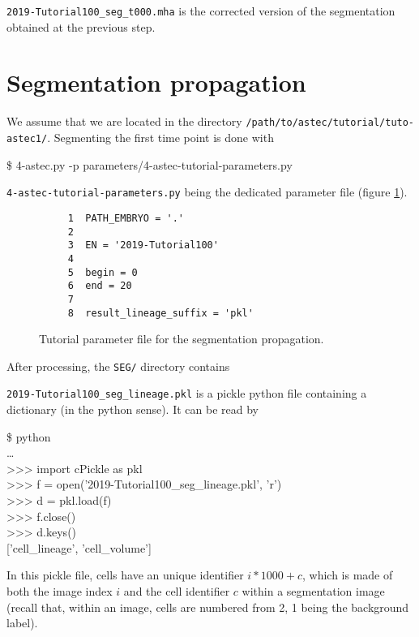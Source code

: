 \texttt{2019-Tutorial100\_seg\_t000.mha} is the corrected version of
the segmentation obtained at the previous step.



\section{Segmentation propagation}
\label{sec:tutorial:segmentation:propagation}

We assume that we are located in the directory
\texttt{/path/to/astec/tutorial/tuto-astec1/}. Segmenting the first
time point is
done with
\begin{code}{0.8}
  \$ 4-astec.py -p parameters/4-astec-tutorial-parameters.py  
\end{code}
\texttt{4-astec-tutorial-parameters.py} being the
dedicated parameter file  (figure \ref{fig:tutorial:parameter:astec}).

\begin{figure}
\begin{framed}
\begin{verbatim}
     1	PATH_EMBRYO = '.'
     2	
     3	EN = '2019-Tutorial100'
     4	
     5	begin = 0
     6	end = 20
     7	
     8	result_lineage_suffix = 'pkl'
\end{verbatim}
\end{framed}
\caption{\label{fig:tutorial:parameter:astec} Tutorial
  parameter file for the segmentation propagation.}
\end{figure}

After processing, the \texttt{SEG/} directory contains

\mbox{}
\mbox{}


\texttt{2019-Tutorial100\_seg\_lineage.pkl} is a pickle python file
containing a dictionary (in the python sense). It can be read by
\begin{code}{0.8}
  \$ python \\
  \ldots \\
  >>> import cPickle as pkl \\
  >>> f = open('2019-Tutorial100\_seg\_lineage.pkl', 'r') \\
  >>> d = pkl.load(f) \\
  >>> f.close()  \\
  >>> d.keys() \\{}
  ['cell\_lineage', 'cell\_volume']
\end{code}
In this pickle file, cells have an unique identifier $i * 1000 + c$, which is made of
both the image index $i$ and the cell identifier $c$ within a segmentation
image (recall that, within an image, cells are numbered from 2, 1 being the background
label).



